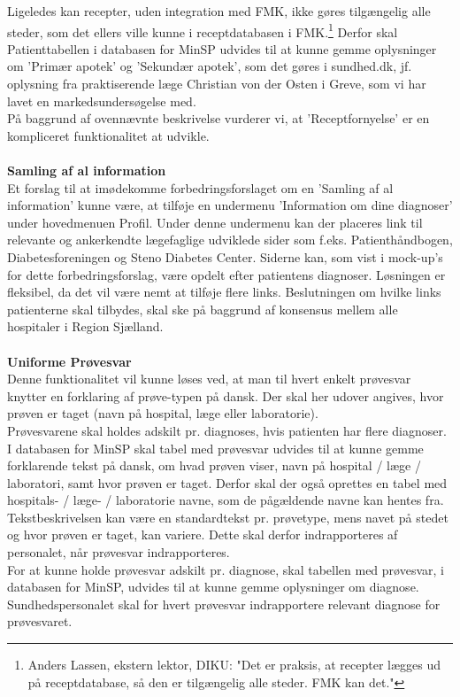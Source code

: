Ligeledes kan recepter, uden integration med FMK, ikke gøres tilgængelig alle steder, som det ellers ville kunne i receptdatabasen i FMK.\footnote{Anders Lassen, ekstern lektor, DIKU: "Det er praksis, at recepter lægges ud på receptdatabase, så den er tilgængelig alle steder. FMK kan det."} Derfor skal Patienttabellen i databasen for MinSP  udvides til at kunne gemme oplysninger om 'Primær apotek' og 'Sekundær apotek', som det gøres i sundhed.dk, jf. oplysning fra praktiserende læge Christian von der Osten i Greve, som vi har lavet en markedsundersøgelse med.\\ 
På baggrund af ovennævnte beskrivelse vurderer vi, at 'Receptfornyelse' er en kompliceret funktionalitet at udvikle.
\\\\
\textbf{Samling af al information} \\
Et forslag til at imødekomme forbedringsforslaget om en 'Samling af al information' kunne være, at tilføje en undermenu 'Information om dine diagnoser' under hovedmenuen Profil. Under denne undermenu kan der placeres link til relevante og ankerkendte lægefaglige udviklede sider som f.eks. Patienthåndbogen, Diabetesforeningen og Steno Diabetes Center. Siderne kan, som vist i mock-up's for dette forbedringsforslag, være opdelt efter patientens diagnoser. Løsningen er fleksibel, da det vil være nemt at tilføje flere links. Beslutningen om hvilke links patienterne skal tilbydes, skal ske på baggrund af konsensus mellem alle hospitaler i Region Sjælland. 
\\\\ 
\textbf{Uniforme Prøvesvar} \\
Denne funktionalitet vil kunne løses ved, at man til hvert enkelt prøvesvar knytter en forklaring af prøve-typen på dansk. Der skal her udover angives, hvor prøven er taget (navn på hospital, læge eller laboratorie).\\
Prøvesvarene skal holdes adskilt pr. diagnoses, hvis patienten har flere diagnoser.\\
I databasen for MinSP skal tabel med prøvesvar udvides til at kunne gemme forklarende tekst på dansk, om hvad prøven viser, navn på hospital / læge / laboratori, samt hvor prøven er taget. Derfor skal der også oprettes en tabel med hospitals- / læge- / laboratorie navne, som de pågældende navne kan hentes fra.\\ 
Tekstbeskrivelsen kan være en standardtekst pr. prøvetype, mens navet på stedet og hvor prøven er taget, kan variere. Dette skal derfor indrapporteres af personalet, når prøvesvar indrapporteres. \\
For at kunne holde prøvesvar adskilt pr. diagnose, skal tabellen med prøvesvar, i databasen for MinSP, udvides til at kunne gemme oplysninger om diagnose. Sundhedspersonalet skal for hvert prøvesvar indrapportere relevant diagnose for prøvesvaret. 
